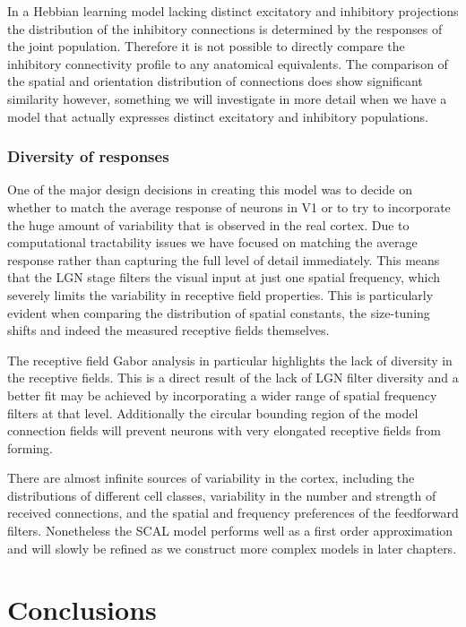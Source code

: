 In a Hebbian learning model lacking distinct excitatory and inhibitory
projections the distribution of the inhibitory connections is
determined by the responses of the joint population. Therefore it is
not possible to directly compare the inhibitory connectivity profile
to any anatomical equivalents. The comparison of the spatial and
orientation distribution of connections does show significant
similarity however, something we will investigate in more detail when
we have a model that actually expresses distinct excitatory and
inhibitory populations.

\subsubsection*{Diversity of responses}

One of the major design decisions in creating this model was to decide
on whether to match the average response of neurons in V1 or to try to
incorporate the huge amount of variability that is observed in the
real cortex. Due to computational tractability issues we have focused
on matching the average response rather than capturing the full level
of detail immediately. This means that the LGN stage filters the
visual input at just one spatial frequency, which severely limits the
variability in receptive field properties. This is particularly
evident when comparing the distribution of spatial constants, the 
size-tuning shifts and indeed the measured receptive fields themselves.

The receptive field Gabor analysis in particular highlights the lack
of diversity in the receptive fields. This is a direct result of the
lack of LGN filter diversity and a better fit may be achieved by
incorporating a wider range of spatial frequency filters at that
level. Additionally the circular bounding region of the model
connection fields will prevent neurons with very elongated receptive
fields from forming.

There are almost infinite sources of variability in the cortex,
including the distributions of different cell classes, variability in
the number and strength of received connections, and the spatial and
frequency preferences of the feedforward filters. Nonetheless the SCAL
model performs well as a first order approximation and will slowly be
refined as we construct more complex models in later chapters.

\section{Conclusions}

